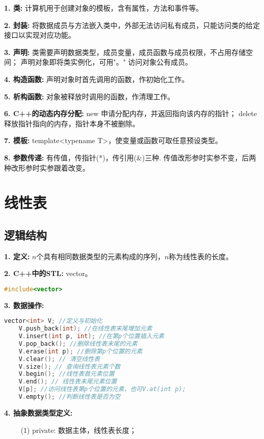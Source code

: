 \textbf{1. 类: }计算机用于创建对象的模板，含有属性，方法和事件等。

\textbf{2. 封装: }将数据成员与方法嵌入类中，外部无法访问私有成员，只能访问类的给定接口以实现对应功能。

\textbf{3. 声明: }类需要声明数据类型，成员变量，成员函数与成员权限，不占用存储空间； 声明对象即将类实例化，可用"。" 访问对象公有成员。

\textbf{4. 构造函数: }声明对象时首先调用的函数，作初始化工作。

\textbf{5. 析构函数: }对象被释放时调用的函数，作清理工作。

\textbf{6. C++的动态内存分配: }new 申请分配内存，并返回指向该内存的指针； delete释放指针指向的内存，指针本身不被删除。

\textbf{7. 模板: }template<typename T>，使变量或函数可取任意预设类型。

\textbf{8. 参数传递: }有传值，传指针(*)，传引用(\&)三种. 传值改形参时实参不变，后两种改形参时实参跟着改变。

\section{线性表}

\subsection{逻辑结构}

\textbf{1. 定义: }$n$个具有相同数据类型的元素构成的序列，$n$称为线性表的长度。

\textbf{2. C++中的STL: }vector。

\begin{lstlisting}[language=C++]
    #include<vector>
\end{lstlisting}

\textbf{3. 数据操作: }
\begin{lstlisting}[language=C++]
    vector<int> V; //定义与初始化
    V.push_back(int); //在线性表末尾增加元素
    V.insert(int p, int); //在第p个位置插入元素
    V.pop_back(); //删除线性表末尾的元素
    V.erase(int p); //删除第p个位置的元素
    V.clear(); // 清空线性表
    V.size(); // 查询线性表元素个数
    V.begin(); //线性表首元素位置
    V.end(); // 线性表末尾元素位置
    V[p]; //访问线性表第p个位置的元素，也可V.at(int p); 
    V.empty(); //判断线性表是否为空
\end{lstlisting}
    
\textbf{4. 抽象数据类型定义: }

~~~~ (1) private: 数据主体，线性表长度；

